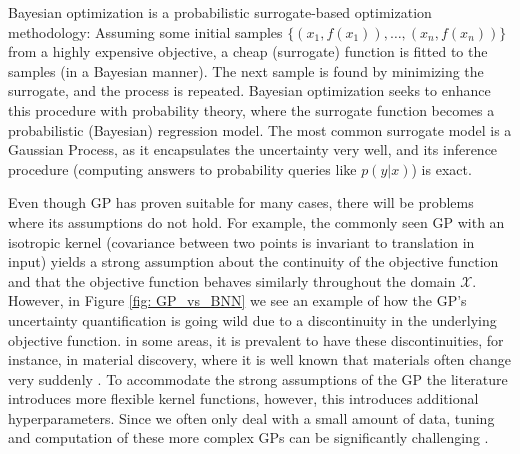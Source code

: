 Bayesian optimization is a probabilistic surrogate-based optimization methodology: Assuming some
initial samples $\{(x_1,f(x_1)), \dots, (x_n,f(x_n))\}$ from a highly expensive objective, a cheap
(surrogate) function is fitted to the samples (in a Bayesian manner). The next sample is found by
minimizing the surrogate, and the process is repeated. Bayesian optimization seeks to enhance this
procedure with probability theory, where the surrogate function becomes a probabilistic (Bayesian)
regression model. The most common surrogate model is a Gaussian Process, as it encapsulates the
uncertainty very well, and its inference procedure (computing answers to probability queries like
$p(y|x)$) is exact.


Even though GP has proven suitable for many cases, there will be problems where its assumptions do
not hold. For example, the commonly seen GP with an isotropic kernel (covariance between two points
is invariant to translation in input) yields a strong assumption about the continuity of the
objective function and that the objective function behaves similarly throughout the domain
$\mathcal{X}$. However, in Figure \ref{fig: GP_vs_BNN} we see an example of how the GP's uncertainty
quantification is going wild due to a discontinuity in the underlying objective function. in some
areas, it is prevalent to have these discontinuities, for instance, in material discovery, where it
is well known that materials often change very suddenly \cite{Nature_BO_paper}. To accommodate the
strong assumptions of the GP the literature introduces more flexible kernel functions, however, this
introduces additional hyperparameters. Since we often only deal with a small amount of data, tuning
and computation of these more complex GPs can be significantly challenging \cite{Nature_BO_paper}.


